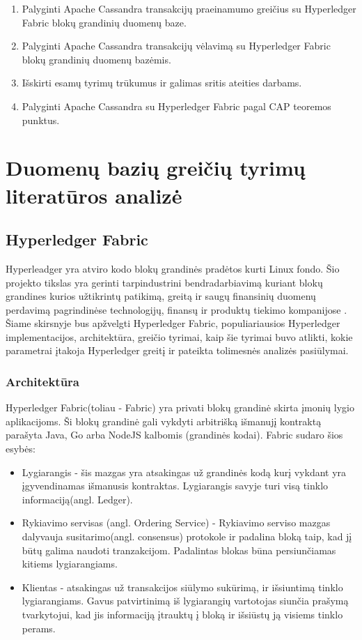 \documentclass{VUMIFPSkursinis}
\begin{document}
	\begin{enumerate}
		\item{Palyginti Apache Cassandra transakcijų praeinamumo greičius su Hyperledger Fabric blokų grandinių duomenų baze.}
		\item{Palyginti Apache Cassandra transakcijų vėlavimą su Hyperledger Fabric blokų grandinių duomenų bazėmis.}
		\item{Išskirti esamų tyrimų trūkumus ir galimas sritis ateities darbams.}
		\item{Palyginti Apache Cassandra su Hyperledger Fabric pagal CAP teoremos punktus.}
		
	\end{enumerate}
\pagebreak
\section{Duomenų bazių greičių tyrimų literatūros analizė}
	\subsection{Hyperledger Fabric}
		Hyperleadger yra atviro kodo blokų grandinės pradėtos kurti Linux fondo. Šio projekto tikslas yra gerinti tarpindustrini bendradarbiavimą kuriant blokų grandines kurios užtikrintų 
		patikimą, greitą ir saugų finansinių duomenų perdavimą pagrindinėse technologijų, finansų ir produktų tiekimo kompanijose \cite{LinuxHyper}. Šiame skirsnyje bus apžvelgti 
		Hyperledger Fabric, populiariausios Hyperledger implementacijos, architektūra, greičio tyrimai, kaip šie tyrimai buvo atlikti, kokie parametrai įtakoja Hyperledger greitį ir pateikta tolimesnės analizės pasiūlymai. 
		\subsubsection{Architektūra}
			Hyperledger Fabric(toliau - Fabric) yra privati blokų grandinė skirta įmonių lygio aplikacijoms. 
			Ši blokų grandinė gali vykdyti arbitrišką išmanujį kontraktą parašyta Java, Go arba NodeJS kalbomis (grandinės kodai).
			Fabric sudaro šios esybės:
			\begin{itemize}
				\item{Lygiarangis - šis mazgas yra atsakingas už grandinės kodą kurį vykdant yra įgyvendinamas išmanusis kontraktas. 
 Lygiarangis savyje turi visą tinklo informaciją(angl. Ledger). }
				\item{Rykiavimo servisas (angl. Ordering Service) - Rykiavimo serviso mazgas dalyvauja susitarimo(angl. consensus) 
protokole ir padalina bloką taip, kad jį būtų galima naudoti tranzakcijom. Padalintas blokas būna persiunčiamas kitiems lygiarangiams.}
				\item{Klientas - atsakingas už transakcijos siūlymo sukūrimą, ir išsiuntimą tinklo lygiarangiams. Gavus patvirtinimą iš lygiarangių vartotojas siunčia prašymą tvarkytojui, kad jis informaciją įtrauktų į bloką ir išsiūstų ją visiems tinklo perams.}
			\end{itemize}
\end{document}
